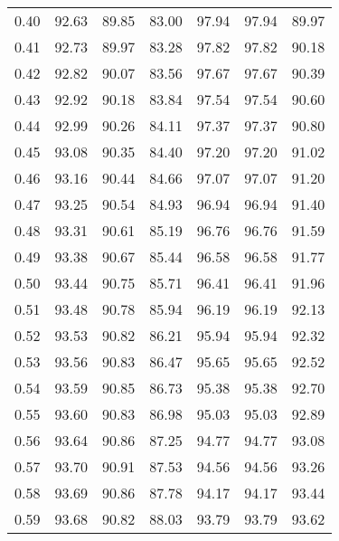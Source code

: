 \begin{tabular}{|c|c|c|c|c|c|c|}
      0.40 &     92.63 &     89.85 &      83.00 &   97.94 &      97.94 &         89.97 \\
      0.41 &     92.73 &     89.97 &      83.28 &   97.82 &      97.82 &         90.18 \\
      0.42 &     92.82 &     90.07 &      83.56 &   97.67 &      97.67 &         90.39 \\
      0.43 &     92.92 &     90.18 &      83.84 &   97.54 &      97.54 &         90.60 \\
      0.44 &     92.99 &     90.26 &      84.11 &   97.37 &      97.37 &         90.80 \\
      0.45 &     93.08 &     90.35 &      84.40 &   97.20 &      97.20 &         91.02 \\
      0.46 &     93.16 &     90.44 &      84.66 &   97.07 &      97.07 &         91.20 \\
      0.47 &     93.25 &     90.54 &      84.93 &   96.94 &      96.94 &         91.40 \\
      0.48 &     93.31 &     90.61 &      85.19 &   96.76 &      96.76 &         91.59 \\
      0.49 &     93.38 &     90.67 &      85.44 &   96.58 &      96.58 &         91.77 \\
      0.50 &     93.44 &     90.75 &      85.71 &   96.41 &      96.41 &         91.96 \\
      0.51 &     93.48 &     90.78 &      85.94 &   96.19 &      96.19 &         92.13 \\
      0.52 &     93.53 &     90.82 &      86.21 &   95.94 &      95.94 &         92.32 \\
      0.53 &     93.56 &     90.83 &      86.47 &   95.65 &      95.65 &         92.52 \\
      0.54 &     93.59 &     90.85 &      86.73 &   95.38 &      95.38 &         92.70 \\
      0.55 &     93.60 &     90.83 &      86.98 &   95.03 &      95.03 &         92.89 \\
      0.56 &     93.64 &     90.86 &      87.25 &   94.77 &      94.77 &         93.08 \\
      0.57 &     93.70 &     90.91 &      87.53 &   94.56 &      94.56 &         93.26 \\
      0.58 &     93.69 &     90.86 &      87.78 &   94.17 &      94.17 &         93.44 \\
      0.59 &     93.68 &     90.82 &      88.03 &   93.79 &      93.79 &         93.62 \\

\end{tabular}
